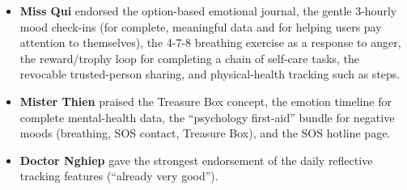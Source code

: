 \begin{itemize}
\item \textbf{Miss Qui} endorsed the option-based emotional journal, the gentle 3-hourly mood check-ins (for complete, meaningful data and for helping users pay attention to themselves), the 4-7-8 breathing exercise as a response to anger, the reward/trophy loop for completing a chain of self-care tasks, the revocable trusted-person sharing, and physical-health tracking such as steps.
\item \textbf{Mister Thien} praised the Treasure Box concept, the emotion timeline for complete mental-health data, the ``psychology first-aid'' bundle for negative moods (breathing, SOS contact, Treasure Box), and the SOS hotline page.
\item \textbf{Doctor Nghiep} gave the strongest endorsement of the daily reflective tracking features (``already very good'').
\end{itemize}
